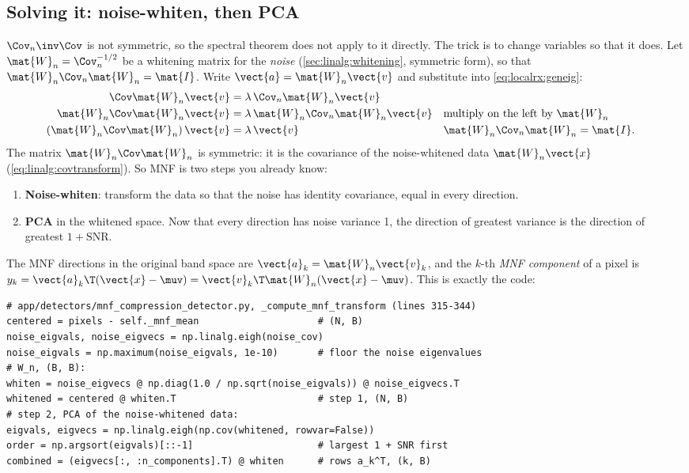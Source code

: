 \subsection{Solving it: noise-whiten, then PCA}

$\Cov_n\inv\Cov$ is not symmetric, so the spectral theorem does not apply to it directly. The trick is
to change variables so that it does. Let $\mat{W}_n = \Cov_n^{-1/2}$ be a whitening matrix for the
\emph{noise} (\cref{sec:linalg:whitening}, symmetric form), so that $\mat{W}_n\Cov_n\mat{W}_n = \mat{I}$.
Write $\vect{a} = \mat{W}_n\vect{v}$ and substitute into \cref{eq:localrx:geneig}:
\begin{align*}
\Cov\mat{W}_n\vect{v} &= \lambda\,\Cov_n\mat{W}_n\vect{v}\\
\mat{W}_n\Cov\mat{W}_n\vect{v} &= \lambda\,\mat{W}_n\Cov_n\mat{W}_n\vect{v}
  && \text{multiply on the left by } \mat{W}_n\\
\left(\mat{W}_n\Cov\mat{W}_n\right)\vect{v} &= \lambda\,\vect{v}
  && \mat{W}_n\Cov_n\mat{W}_n = \mat{I}.
\end{align*}
The matrix $\mat{W}_n\Cov\mat{W}_n$ is symmetric: it is the covariance of the noise-whitened data
$\mat{W}_n\vect{x}$ (\cref{eq:linalg:covtransform}). So MNF is two steps you already know:
\begin{enumerate}
  \item \textbf{Noise-whiten}: transform the data so that the noise has identity covariance, equal in
    every direction.
  \item \textbf{PCA} in the whitened space. Now that every direction has noise variance 1, the
    direction of greatest variance is the direction of greatest $1 + \text{SNR}$.
\end{enumerate}
The MNF directions in the original band space are $\vect{a}_k = \mat{W}_n\vect{v}_k$, and the $k$-th
\emph{MNF component} of a pixel is $y_k = \vect{a}_k\T(\vect{x} - \muv) = \vect{v}_k\T\mat{W}_n(\vect{x} -
\muv)$. This is exactly the code:

\begin{lstlisting}
# app/detectors/mnf_compression_detector.py, _compute_mnf_transform (lines 315-344)
centered = pixels - self._mnf_mean                     # (N, B)
noise_eigvals, noise_eigvecs = np.linalg.eigh(noise_cov)
noise_eigvals = np.maximum(noise_eigvals, 1e-10)       # floor the noise eigenvalues
# W_n, (B, B):
whiten = noise_eigvecs @ np.diag(1.0 / np.sqrt(noise_eigvals)) @ noise_eigvecs.T
whitened = centered @ whiten.T                         # step 1, (N, B)
# step 2, PCA of the noise-whitened data:
eigvals, eigvecs = np.linalg.eigh(np.cov(whitened, rowvar=False))
order = np.argsort(eigvals)[::-1]                      # largest 1 + SNR first
combined = (eigvecs[:, :n_components].T) @ whiten      # rows a_k^T, (k, B)
\end{lstlisting}

